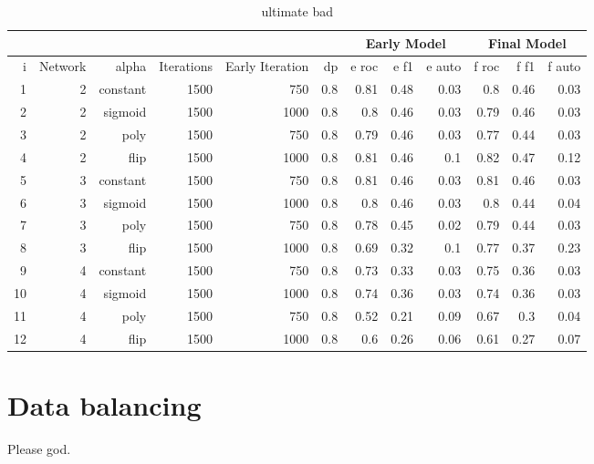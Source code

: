 \begin{table}[!h] { \small \centering
  \begin{tabular}{rrrrrrrrrrrr}
    &&&&& &  \multicolumn{3}{|c|}{Early Model} &  \multicolumn{3}{c|}{Final Model}    \\
  \hline
     i & Network                 & alpha    &   Iterations &   Early Iteration &   dp &   e roc &   e f1 &   e auto &   f roc &   f f1 &   f auto \\
  \hline
     1 & 2 & constant & 1500 &   750 &  0.8 &    0.81 &   0.48 &     0.03 &    0.8  &   0.46 &     0.03 \\
     2 & 2 & sigmoid  & 1500 &  1000 &  0.8 &    0.8  &   0.46 &     0.03 &    0.79 &   0.46 &     0.03 \\
     3 & 2 & poly     & 1500 &   750 &  0.8 &    0.79 &   0.46 &     0.03 &    0.77 &   0.44 &     0.03 \\
     4 & 2 & flip     & 1500 &  1000 &  0.8 &    0.81 &   0.46 &     0.1  &    0.82 &   0.47 &     0.12 \\
\hline
     5 & 3 & constant & 1500 &   750 &  0.8 &    0.81 &   0.46 &     0.03 &    0.81 &   0.46 &     0.03 \\
     6 & 3 & sigmoid  & 1500 &  1000 &  0.8 &    0.8  &   0.46 &     0.03 &    0.8  &   0.44 &     0.04 \\
     7 & 3 & poly     & 1500 &   750 &  0.8 &    0.78 &   0.45 &     0.02 &    0.79 &   0.44 &     0.03 \\
     8 & 3 & flip     & 1500 &  1000 &  0.8 &    0.69 &   0.32 &     0.1  &    0.77 &   0.37 &     0.23 \\
\hline
     9 & 4 & constant & 1500 &   750 &  0.8 &    0.73 &   0.33 &     0.03 &    0.75 &   0.36 &     0.03 \\
    10 & 4 & sigmoid  & 1500 &  1000 &  0.8 &    0.74 &   0.36 &     0.03 &    0.74 &   0.36 &     0.03 \\
    11 & 4 & poly     & 1500 &   750 &  0.8 &    0.52 &   0.21 &     0.09 &    0.67 &   0.3  &     0.04 \\
    12 & 4 & flip     & 1500 &  1000 &  0.8 &    0.6  &   0.26 &     0.06 &    0.61 &   0.27 &     0.07 \\
  \hline
  \end{tabular}  } \caption{ultimate bad} \label{tab:pseaafasfrch} \end{table}
\newpage
%
%
%
%
%
\section{Data balancing}
Please god.
